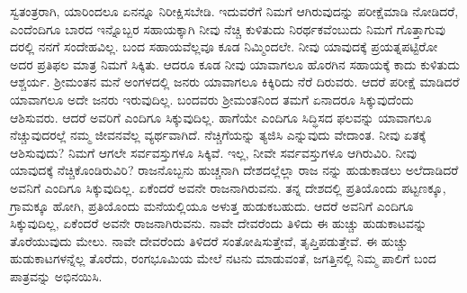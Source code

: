 ಸ್ವತಂತ್ರರಾಗಿ, ಯಾರಿಂದಲೂ ಏನನ್ನೂ ನಿರೀಕ್ಷಿಸಬೇಡಿ. ಇದುವರೆಗೆ ನಿಮಗೆ ಆಗಿರುವುದನ್ನು ಪರೀಕ್ಷೆಮಾಡಿ ನೋಡಿದರೆ, ಎಂದೆಂದಿಗೂ ಬಾರದ ಇನ್ನೊಬ್ಬರ ಸಹಾಯಕ್ಕಾಗಿ ನೀವು ನೆಚ್ಚಿ ಕುಳಿತುದು ನಿರರ್ಥಕವೆಂಬುದು ನಿಮಗೆ ಗೊತ್ತಾಗುವು ದರಲ್ಲಿ ನನಗೆ ಸಂದೇಹವಿಲ್ಲ. ಬಂದ ಸಹಾಯವೆಲ್ಲವೂ ಕೂಡ ನಿಮ್ಮಿಂದಲೇ. ನೀವು ಯಾವುದಕ್ಕೆ ಪ್ರಯತ್ನಪಟ್ಟಿರೋ ಅದರ ಪ್ರತಿಫಲ ಮಾತ್ರ ನಿಮಗೆ ಸಿಕ್ಕಿತು. ಆದರೂ ಕೂಡ ನೀವು ಯಾವಾಗಲೂ ಹೊರಗಿನ ಸಹಾಯಕ್ಕೆ ಕಾದು ಕುಳಿತುದು ಆಶ್ಚರ್ಯ. ಶ‍್ರೀಮಂತನ ಮನೆ ಅಂಗಳದಲ್ಲಿ ಜನರು ಯಾವಾಗಲೂ ಕಿಕ್ಕಿರಿದು ನೆರೆ ದಿರುವರು. ಆದರೆ ಪರೀಕ್ಷೆ ಮಾಡಿದರೆ ಯಾವಾಗಲೂ ಅದೇ ಜನರು ಇರುವುದಿಲ್ಲ. ಬಂದವರು ಶ‍್ರೀಮಂತನಿಂದ ತಮಗೆ ಏನಾದರೂ ಸಿಕ್ಕುವುದೆಂದು ಆಶಿಸುವರು. ಆದರೆ ಅವರಿಗೆ ಎಂದಿಗೂ ಸಿಕ್ಕುವುದಿಲ್ಲ. ಹಾಗೆಯೇ ಎಂದಿಗೂ ಸಿದ್ಧಿಸದ ಫಲವನ್ನು ಯಾವಾಗಲೂ ನೆಚ್ಚುವುದರಲ್ಲೆ ನಮ್ಮ ಜೀವನವೆಲ್ಲ ವ್ಯರ್ಥವಾಗಿದೆ. ನೆಚ್ಚಿಗೆಯನ್ನು ತ್ಯಜಿಸಿ ಎನ್ನುವುದು ವೇದಾಂತ. ನೀವು ಏತಕ್ಕೆ ಆಶಿಸುವುದು? ನಿಮಗೆ ಆಗಲೇ ಸರ್ವವಸ್ತುಗಳೂ ಸಿಕ್ಕಿವೆ. ಇಲ್ಲ, ನೀವೇ ಸರ್ವವಸ್ತುಗಳೂ ಆಗಿರುವಿರಿ. ನೀವು ಯಾವುದಕ್ಕೆ ನೆಚ್ಚಿಕೊಂಡಿರುವಿರಿ? ರಾಜನೊಬ್ಬನು ಹುಚ್ಚನಾಗಿ ದೇಶದಲ್ಲೆಲ್ಲಾ ರಾಜ ನನ್ನು ಹುಡುಕಾಡಲು ಅಲೆದಾಡಿದರೆ ಅವನಿಗೆ ಎಂದಿಗೂ ಸಿಕ್ಕುವುದಿಲ್ಲ. ಏಕೆಂದರೆ ಅವನೇ ರಾಜನಾಗಿರುವನು. ತನ್ನ ದೇಶದಲ್ಲಿ ಪ್ರತಿಯೊಂದು ಪಟ್ಟಣಕ್ಕೂ, ಗ್ರಾಮಕ್ಕೂ ಹೋಗಿ, ಪ್ರತಿಯೊಂದು ಮನೆಯಲ್ಲಿಯೂ ಅಳುತ್ತ ಹುಡುಕಬಹುದು. ಆದರೆ ಅವನಿಗೆ ಎಂದಿಗೂ ಸಿಕ್ಕುವುದಿಲ್ಲ, ಏಕೆಂದರೆ ಅವನೇ ರಾಜನಾಗಿರುವನು. ನಾವೇ ದೇವರೆಂದು ತಿಳಿದು ಈ ಹುಚ್ಚು ಹುಡುಕಾಟವನ್ನು ತೊರೆಯುವುದು ಮೇಲು. ನಾವೇ ದೇವರೆಂದು ತಿಳಿದರೆ ಸಂತೋಷಿಸುತ್ತೇವೆ, ತೃಪ್ತಿಪಡುತ್ತೇವೆ. ಈ ಹುಚ್ಚು ಹುಡುಕಾಟಗಳನ್ನೆಲ್ಲ ತೊರೆದು, ರಂಗಭೂಮಿಯ ಮೇಲೆ ನಟನು ಮಾಡುವಂತೆ, ಜಗತ್ತಿನಲ್ಲಿ ನಿಮ್ಮ ಪಾಲಿಗೆ ಬಂದ ಪಾತ್ರವನ್ನು ಅಭಿನಯಿಸಿ.

